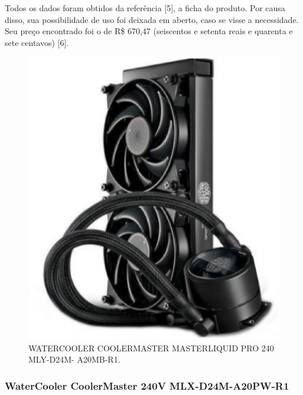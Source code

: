 Todos os dados foram obtidos da referência [5], a ficha do produto. Por causa disso, sua possibilidade de uso foi deixada em aberto, caso se visse a necessidade. Seu preço encontrado foi o de R\$ 670,47 (seiscentos e setenta reais e quarenta e sete centavos) [6].

\begin{figure}[!htb]                                                               
   \centering                                                                      
   \includegraphics[scale=0.4, keepaspectratio=true]{figuras/watercooler2.eps}
   \caption{WATERCOOLER COOLERMASTER MASTERLIQUID PRO 240 MLY-D24M- A20MB-R1.}               
\end{figure}

\subsubsection{WaterCooler CoolerMaster 240V MLX-D24M-A20PW-R1}

